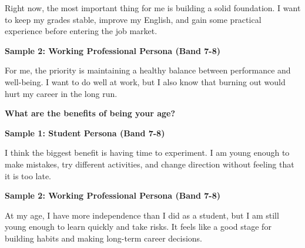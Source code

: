 Right now, the most important thing for me is building a solid foundation. I want to keep my grades stable, improve my English, and gain some practical experience before entering the job market.

\textbf{Sample 2: Working Professional Persona (Band 7-8)}

For me, the priority is maintaining a healthy balance between performance and well-being. I want to do well at work, but I also know that burning out would hurt my career in the long run.

\separator

\begin{ieltsquestion}
\textbf{What are the benefits of being your age?}
\end{ieltsquestion}
\textbf{Sample 1: Student Persona (Band 7-8)}

I think the biggest benefit is having time to experiment. I am young enough to make mistakes, try different activities, and change direction without feeling that it is too late.

\textbf{Sample 2: Working Professional Persona (Band 7-8)}

At my age, I have more independence than I did as a student, but I am still young enough to learn quickly and take risks. It feels like a good stage for building habits and making long-term career decisions.

\separator


